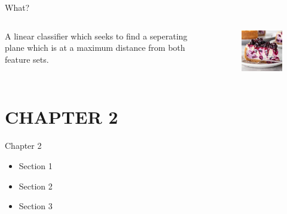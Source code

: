 \documentclass{beamer}
\begin{document}



\begin{frame}{What?}
    \begin{columns}
        \begin{column}{0.45\textwidth}
            A linear classifier which seeks to find a seperating plane which is at a maximum distance from both feature sets.
        \end{column}
        \begin{column}{0.45\textwidth}
            \begin{figure}
                \includegraphics[height=\textheight]{Images/bbc.jpeg}
            \end{figure}
        \end{column}
    \end{columns}
\end{frame}


\section{CHAPTER 2}

\begin{chapter}{}{Chapter 2}
    \begin{itemize}
        \item Section 1
        \item Section 2
        \item Section 3
    \end{itemize}
\end{chapter}
\end{document}
